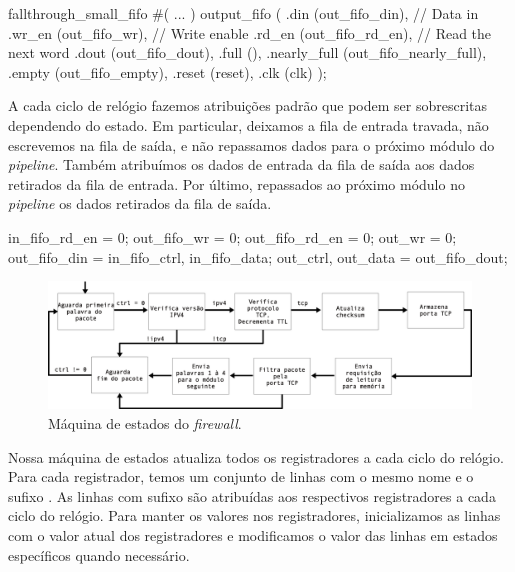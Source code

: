 \begin{verilogcode}
   fallthrough_small_fifo #(
      ...
   ) output_fifo (
      .din           (out_fifo_din),   // Data in
      .wr_en         (out_fifo_wr),    // Write enable
      .rd_en         (out_fifo_rd_en), // Read the next word
      .dout          (out_fifo_dout),
      .full          (),
      .nearly_full   (out_fifo_nearly_full),
      .empty         (out_fifo_empty),
      .reset         (reset),
      .clk           (clk)
   );
\end{verilogcode}

A cada ciclo de relógio fazemos atribuições padrão que podem ser
sobrescritas dependendo do estado.  Em particular, deixamos a fila de
entrada travada, não escrevemos na fila de saída, e não repassamos dados
para o próximo módulo do \emph{pipeline}.  Também atribuímos os dados de
entrada da fila de saída aos dados retirados da fila de entrada.  Por
último, repassados ao próximo módulo no \emph{pipeline} os dados
retirados da fila de saída.

\begin{verilogcode}
    in_fifo_rd_en = 0;
    out_fifo_wr = 0;
    out_fifo_rd_en = 0;
    out_wr = 0;
    out_fifo_din = {in_fifo_ctrl, in_fifo_data};
    {out_ctrl, out_data} = out_fifo_dout;
\end{verilogcode}

\begin{figure}\centering
\includegraphics[scale=0.4]{figures/modulos/mestados.eps}
\caption{Máquina de estados do \emph{firewall}.}
\label{fig:impl.state.machine}
\end{figure}

Nossa máquina de estados atualiza todos os registradores a cada ciclo do
relógio.  Para cada registrador, temos um conjunto de linhas com o mesmo
nome e o sufixo .  As linhas com sufixo  são
atribuídas aos respectivos registradores a cada ciclo do relógio.  Para
manter os valores nos registradores, inicializamos as linhas 
com o valor atual dos registradores e modificamos o valor das linhas
 em estados específicos quando necessário.

